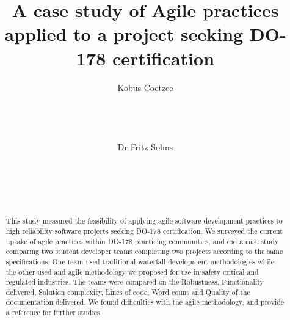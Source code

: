 \documentclass{sig-alternate-05-2015}
\begin{document}






%

\title{A case study of Agile practices applied to a project seeking DO-178 certification}

\author{
\alignauthor
Kobus Coetzee\\
\\
\\
\\
\\
\alignauthor
Dr Fritz Solms\\
\\
\\
\\
\\
}

\maketitle
\begin{abstract}
This study measured the feasibility of applying agile software development practices to high reliability software projects seeking DO-178 certification. We surveyed the current uptake of agile practices within DO-178 practicing communities, and did a case study comparing two student developer teams completing two projects according to the same specifications. One team used traditional waterfall development methodologies while the other used and agile methodology we proposed for use in safety critical and regulated industries. The teams were compared on the Robustness, Functionality delivered, Solution complexity, Lines of code, Word count and Quality of the documentation delivered. We found difficulties with the agile methodology, and provide a reference for further studies.
\end{abstract}
\end{document}
